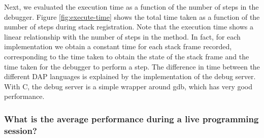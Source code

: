 \documentclass[english,submission]{programming}
\begin{document}
Next, we evaluated the execution time as a function of the number of steps in the debugger. 
Figure \ref{fig:execute-time} shows the total time taken as a function of the number of steps during stack registration.
Note that the execution time shows a linear relationship with the number of steps in the method. 
In fact, for each implementation we obtain a constant time for each stack frame recorded, corresponding to the time taken to obtain the state of the stack frame and the time taken for the debugger to perform a step. 
The difference in time between the different DAP languages is explained by the implementation of the debug server. 
With C, the debug server is a simple wrapper around gdb, which has very good performance.

\subsubsection{What is the average performance during a live programming session?}
\end{document}
